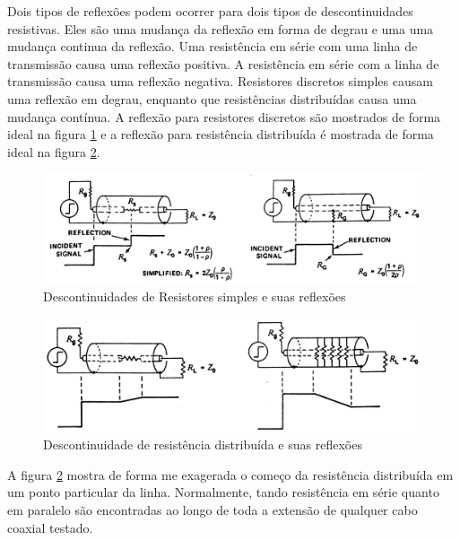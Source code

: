 Dois tipos de reflexões podem ocorrer para dois tipos de descontinuidades resistivas. Eles são uma mudança da reflexão em forma de degrau e uma uma mudança continua da reflexão. Uma resistência em série com uma linha de transmissão causa uma reflexão positiva. A resistência em série com a linha de transmissão causa uma reflexão negativa. Resistores discretos simples causam uma reflexão em degrau, enquanto que resistências distribuídas causa uma mudança contínua. A reflexão para resistores discretos são mostrados de forma ideal na figura \ref{fig:descontinuidade_resistor_simples} e a reflexão para resistência distribuída é mostrada de forma ideal na figura \ref{fig:descontinuidade_resistor_distribuido}.

\begin{figure}[htb!]
	\begin{center}
		\includegraphics[scale=.15]{./cap2/figuras/discontinuidade_resistor_simples.png}
		\caption{Descontinuidades de Resistores simples e suas reflexões}
		\label{fig:descontinuidade_resistor_simples}
	\end{center}
\end{figure}

\begin{figure}[htb!]
	\begin{center}
		\includegraphics[scale=.15]{./cap2/figuras/discontinuidade_resistor_distrubuido.png}
		\caption{Descontinuidade de resistência distribuída e suas reflexões}
		\label{fig:descontinuidade_resistor_distribuido}
	\end{center}
\end{figure}

A figura \ref{fig:descontinuidade_resistor_distribuido} mostra de forma me exagerada o começo da resistência distribuída em um ponto particular da linha. Normalmente, tando resistência em série quanto em paralelo são encontradas ao longo de toda a extensão de qualquer cabo coaxial testado.

